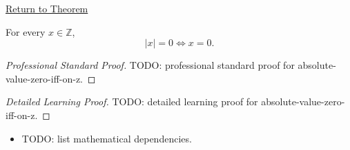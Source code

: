 \newpage
{}
\label{prf:absolute-value-zero-iff-on-z}

\begin{remark*}[Return]
\hyperref[thm:absolute-value-zero-iff-on-z]{Return to Theorem}
\end{remark*}

\begin{theorem*}
For every $x\in\mathbb{Z}$,
\[
|x|=0 \Longleftrightarrow x=0.
\]
\end{theorem*}

\begin{proof}[Professional Standard Proof]
\LRAProofBodyStart
TODO: professional standard proof for absolute-value-zero-iff-on-z.
\end{proof}

\begin{proof}[Detailed Learning Proof]
\LRAProofBodyStart
TODO: detailed learning proof for absolute-value-zero-iff-on-z.
\end{proof}

\begin{remark*}
\end{remark*}

\begin{dependencies}
\begin{itemize}
  \item TODO: list mathematical dependencies.
\end{itemize}
\end{dependencies}

\clearpage
